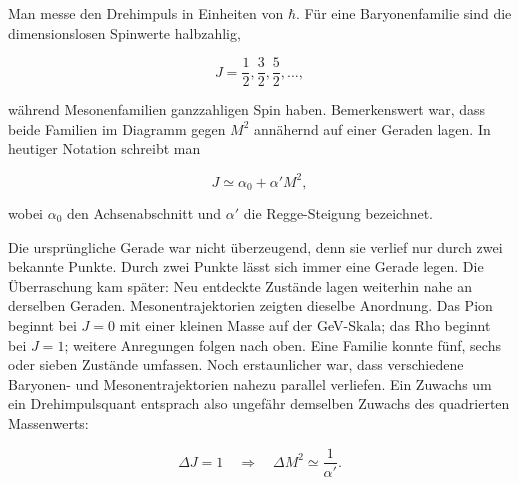 Man messe den Drehimpuls in Einheiten von \(\hbar\). Für eine Baryonenfamilie sind die dimensionslosen Spinwerte halbzahlig,

\begin{equation}
  J=\frac12,\frac32,\frac52,\ldots,
\end{equation}

während Mesonenfamilien ganzzahligen Spin haben. Bemerkenswert war, dass beide Familien im Diagramm gegen \(M^2\) annähernd auf einer Geraden lagen. In heutiger Notation schreibt man

\begin{equation}
  J\simeq \alpha_0+\alpha' M^2,
  \label{eq:l01-regge-trajectory}
\end{equation}

wobei \(\alpha_0\) den Achsenabschnitt und \(\alpha'\) die Regge-Steigung bezeichnet.

Die ursprüngliche Gerade war nicht überzeugend, denn sie verlief nur durch zwei bekannte Punkte. Durch zwei Punkte lässt sich immer eine Gerade legen. Die Überraschung kam später: Neu entdeckte Zustände lagen weiterhin nahe an derselben Geraden. Mesonentrajektorien zeigten dieselbe Anordnung. Das Pion beginnt bei \(J=0\) mit einer kleinen Masse auf der GeV-Skala; das Rho beginnt bei \(J=1\); weitere Anregungen folgen nach oben. Eine Familie konnte fünf, sechs oder sieben Zustände umfassen. Noch erstaunlicher war, dass verschiedene Baryonen- und Mesonentrajektorien nahezu parallel verliefen. Ein Zuwachs um ein Drehimpulsquant entsprach also ungefähr demselben Zuwachs des quadrierten Massenwerts:

\begin{equation}
  \Delta J=1
  \quad\Longrightarrow\quad
  \Delta M^2\simeq \frac{1}{\alpha'}.
  \label{eq:l01-regge-spacing}
\end{equation}

\begin{classroomqa}
\end{classroomqa}

